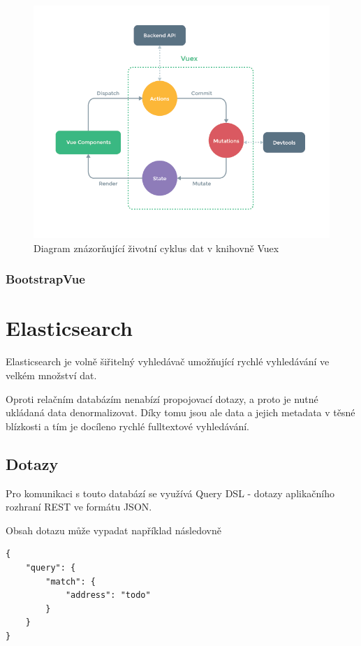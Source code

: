 \begin{figure}[H]
	\centering
	\includegraphics[width=\textwidth]{images/vuex.png}
	\caption{Diagram znázorňující životní cyklus dat v knihovně Vuex}
	\label{vuex-dataflow}
\end{figure}

\blindtext

\subsubsection*{BootstrapVue}

\section{Elasticsearch}
Elasticsearch je volně šiřitelný vyhledávač umožňující rychlé vyhledávání ve velkém množství dat. 

Oproti relačním databázím nenabízí propojovací dotazy, a proto je nutné ukládaná data denormalizovat. Díky tomu jsou ale data a jejich metadata v těsné blízkosti a tím je docíleno rychlé fulltextové vyhledávání. %

\subsection{Dotazy}
Pro komunikaci s touto databází se využívá Query DSL - dotazy aplikačního rozhraní REST ve formátu JSON.

Obsah dotazu může vypadat například následovně
\begin{verbatim}
{
    "query": {
        "match": {
            "address": "todo"
        }
    }
}
\end{verbatim} %

